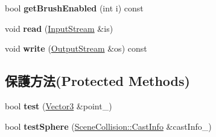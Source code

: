 \begin{DoxyCompactItemize}
\item 
bool {\bfseries get\+Brush\+Enabled} (int i) const \hypertarget{class_magnum_1_1_scene_collision_1_1_data_a922978a1494fc270511c23018215d17c}{}\label{class_magnum_1_1_scene_collision_1_1_data_a922978a1494fc270511c23018215d17c}

\item 
void {\bfseries read} (\hyperlink{class_magnum_1_1_input_stream}{Input\+Stream} \&is)\hypertarget{class_magnum_1_1_scene_collision_1_1_data_a801ff29438c640b9592aa8a3e2ee0db4}{}\label{class_magnum_1_1_scene_collision_1_1_data_a801ff29438c640b9592aa8a3e2ee0db4}

\item 
void {\bfseries write} (\hyperlink{class_magnum_1_1_output_stream}{Output\+Stream} \&os) const \hypertarget{class_magnum_1_1_scene_collision_1_1_data_a2542a11b2b0a17f96415436f00af21b7}{}\label{class_magnum_1_1_scene_collision_1_1_data_a2542a11b2b0a17f96415436f00af21b7}

\end{DoxyCompactItemize}
\subsection*{保護方法(Protected Methods)}
\begin{DoxyCompactItemize}
\item 
bool {\bfseries test} (\hyperlink{class_magnum_1_1_vector3}{Vector3} \&point\+\_\+)\hypertarget{class_magnum_1_1_scene_collision_1_1_data_a6bdb978f344cf16bf1b8f670a1907cb7}{}\label{class_magnum_1_1_scene_collision_1_1_data_a6bdb978f344cf16bf1b8f670a1907cb7}

\item 
bool {\bfseries test\+Sphere} (\hyperlink{class_magnum_1_1_scene_collision_1_1_cast_info}{Scene\+Collision\+::\+Cast\+Info} \&cast\+Info\+\_\+)\hypertarget{class_magnum_1_1_scene_collision_1_1_data_a1325c4722caf46a879f333c52032e4d9}{}\label{class_magnum_1_1_scene_collision_1_1_data_a1325c4722caf46a879f333c52032e4d9}

\end{DoxyCompactItemize}
